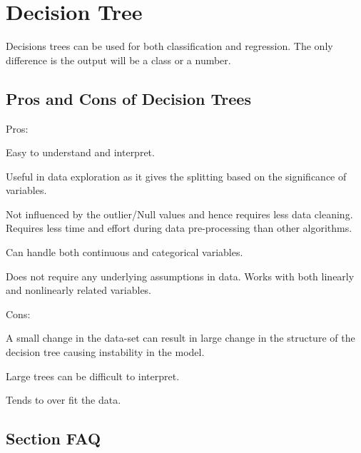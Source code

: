 	\section{Decision Tree}
Decisions trees can be used for both classification and regression.  The only difference is the output will be a class or a number.

	\subsection{Pros and Cons of Decision Trees}
Pros:
	\begin{bulletedlist}
		\item Easy to understand and interpret.
		\item Useful in data exploration as it gives the splitting based on the significance of variables.
		\item Not influenced by the outlier/Null values and hence requires less data cleaning. Requires less time and effort during data pre-processing than other algorithms.
		\item Can handle both continuous and categorical variables.
		\item Does not require any underlying assumptions in data.  Works with both linearly and nonlinearly related variables.
	\end{bulletedlist}

Cons:
	\begin{bulletedlist}
		\item A small change in the data-set can result in large change in the structure of the decision tree causing instability in the model.
		\item Large trees can be difficult to interpret.
		\item Tends to over fit the data.
	\end{bulletedlist}

	\subsection{Section FAQ}
    \begin{qanda}

    \end{qanda}

